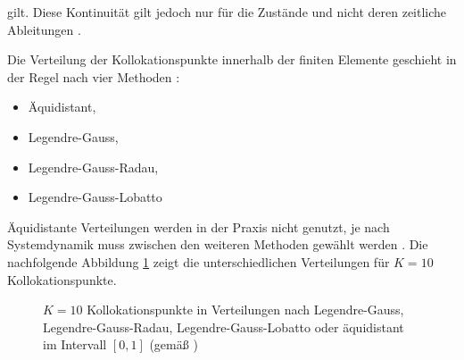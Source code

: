 \vspace*{-\baselineskip}gilt.
Diese Kontinuität gilt jedoch nur für die Zustände und nicht deren zeitliche Ableitungen \cite[S.2]{Cizniar}.

Die Verteilung der Kollokationspunkte innerhalb der finiten Elemente geschieht in der Regel nach vier Methoden \cite[S.48]{Huntington}:
\begin{itemize}
    \item Äquidistant,
    \item Legendre-Gauss,
    \item Legendre-Gauss-Radau,
    \item Legendre-Gauss-Lobatto
\end{itemize}
Äquidistante Verteilungen werden in der Praxis nicht genutzt, je nach Systemdynamik muss zwischen den weiteren Methoden gewählt werden \cite{Huntington}.
Die nachfolgende Abbildung \ref{fig_Kollokationspunkte} zeigt die unterschiedlichen Verteilungen für $K=10$ Kollokationspunkte.

\begin{figure}[h!]
    \centering
    \setlength{\fboxsep}{1pt}
    \setlength{\fboxrule}{1pt}
    \caption[$K=10$ Kollokationspunkte in Verteilungen nach Legendre-Gauss, Legendre-Gauss-Radau, Legendre-Gauss-Lobatto oder äquidistant im Intervall {$\left[0,1\right]$}]{$K=10$ Kollokationspunkte in Verteilungen nach Legendre-Gauss, Legendre-Gauss-Radau, Legendre-Gauss-Lobatto oder äquidistant im Intervall $\left[0,1\right]$ (gemäß \cite[S.48]{Huntington})}
    \label{fig_Kollokationspunkte}
\end{figure}

